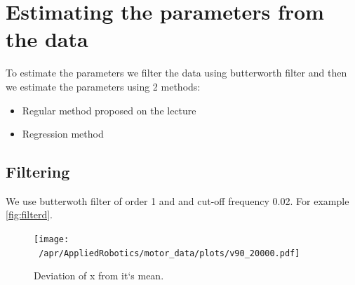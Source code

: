 \documentclass[a4paper,12pt,oneside]{article}
\begin{document}
\section {Estimating the parameters from the data}
To estimate the parameters we filter the data using butterworth filter and then we estimate the parameters using 2 methods:
\begin{itemize}
\item Regular method proposed on the lecture
\item Regression method
\end{itemize}

\subsection {Filtering}
We use butterwoth filter of order 1 and and cut-off frequency 0.02. For example \cref{fig:filterd}.
\begin{figure}[t]%
	\centering
	\texttt{[image: ~/apr/AppliedRobotics/motor\_data/plots/v90\_20000.pdf]}
	\caption{Deviation of x from it`s mean.}%
	\label{fig:filtered}%
\end{figure}
\end{document}
